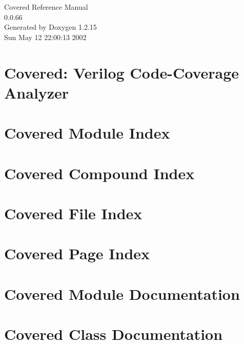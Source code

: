 \documentclass[a4paper]{book}
\begin{document}
\begin{titlepage}
\vspace*{7cm}
\begin{center}
{\Large Covered Reference Manual\\[1ex]\large 0.0.66}\\
\vspace*{1cm}
{\large Generated by Doxygen 1.2.15}\\
\vspace*{0.5cm}
{\small Sun May 12 22:00:13 2002}\\
\end{center}
\end{titlepage}
\clearemptydoublepage
{}
\tableofcontents
\clearemptydoublepage
{}
\chapter{Covered: Verilog Code-Coverage Analyzer}
\label{index}
\chapter{Covered Module Index}

\chapter{Covered Compound Index}

\chapter{Covered File Index}

\chapter{Covered Page Index}

\chapter{Covered Module Documentation}










\chapter{Covered Class Documentation}
























\end{document}
